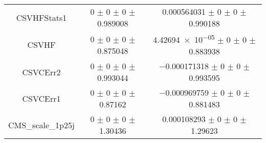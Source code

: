 \begin{table}
\begin{tabular}{ccc}
CSVHFStats1 & \num{0} $\pm$ \num{0} $\pm$ \num{0} $\pm$ \num{0.989008} & \num{0.000564031} $\pm$ \num{0} $\pm$ \num{0} $\pm$ \num{0.990188}\\
CSVHF & \num{0} $\pm$ \num{0} $\pm$ \num{0} $\pm$ \num{0.875048} & \num{4.42694e-05} $\pm$ \num{0} $\pm$ \num{0} $\pm$ \num{0.883938}\\
CSVCErr2 & \num{0} $\pm$ \num{0} $\pm$ \num{0} $\pm$ \num{0.993044} & \num{-0.000171318} $\pm$ \num{0} $\pm$ \num{0} $\pm$ \num{0.993595}\\
CSVCErr1 & \num{0} $\pm$ \num{0} $\pm$ \num{0} $\pm$ \num{0.87162} & \num{-0.000969759} $\pm$ \num{0} $\pm$ \num{0} $\pm$ \num{0.881483}\\
CMS\_scale\_1p25j & \num{0} $\pm$ \num{0} $\pm$ \num{0} $\pm$ \num{1.30436} & \num{0.000108293} $\pm$ \num{0} $\pm$ \num{0} $\pm$ \num{1.29623}\\
\bottomrule
\end{tabular}
\end{table}